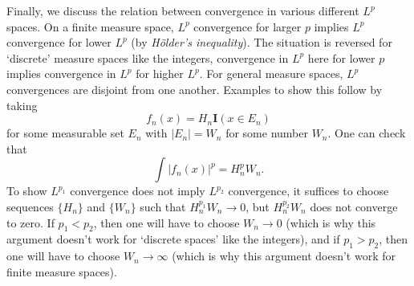 \documentclass[answers]{exam}
\theoremstyle{problemstyle}
\newcommand{\1}[1]{\textbf{1}_{\left[#1\right]}} %
\begin{document}
Finally, we discuss the relation between convergence in various different $L^p$ spaces. On a finite measure space, $L^p$ convergence for larger $p$ implies $L^p$ convergence for lower $L^p$ (by \emph{H\"{o}lder's inequality}). The situation is reversed for `discrete' measure spaces like the integers, convergence in $L^p$ here for lower $p$ implies convergence in $L^p$ for higher $L^p$. For general measure spaces, $L^p$ convergences are disjoint from one another. Examples to show this follow by taking
%
\[ f_n(x) = H_n \mathbf{I}(x \in E_n) \]
%
for some measurable set $E_n$ with $|E_n| = W_n$ for some number $W_n$. One can check that
%
\[ \int |f_n(x)|^p = H_n^p W_n. \]
%
To show $L^{p_1}$ convergence does not imply $L^{p_2}$ convergence, it suffices to choose sequences $\{ H_n \}$ and $\{ W_n \}$ such that $H_n^{p_1} W_n \to 0$, but $H_n^{p_2} W_n$ does not converge to zero. If $p_1 < p_2$, then one will have to choose $W_n \to 0$ (which is why this argument doesn't work for `discrete spaces' like the integers), and if $p_1 > p_2$, then one will have to choose $W_n \to \infty$ (which is why this argument doesn't work for finite measure spaces).
\end{document}
